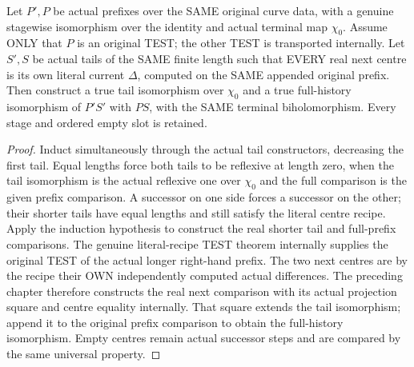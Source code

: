\begin{theorem}
\label{hir:sharp-original-curve-equal-length-difference-recipe-comparison}
\leanok
Let $P',P$ be actual prefixes over the SAME original curve data, with a
genuine stagewise isomorphism over the identity and actual terminal map
$\chi_0$. Assume ONLY that $P$ is an original TEST; the other TEST is
transported internally. Let $S',S$ be actual tails of the SAME finite
length such that EVERY real next centre is its own literal current
$\Delta$, computed on the SAME appended original prefix. Then construct
a true tail isomorphism over $\chi_0$ and a true full-history isomorphism
of $P'S'$ with $PS$, with the SAME terminal biholomorphism. Every stage
and ordered empty slot is retained.
\end{theorem}
\begin{proof}
Induct simultaneously through the actual tail constructors, decreasing
the first tail. Equal lengths force both tails to be reflexive at length
zero, when the tail isomorphism is the actual reflexive one over
$\chi_0$ and the full comparison is the given prefix comparison.
A successor on one side forces a successor on the other; their shorter
tails have equal lengths and still satisfy the literal centre recipe.
Apply the induction hypothesis to construct the real shorter tail and
full-prefix comparisons. The genuine literal-recipe TEST theorem
internally supplies the original TEST of the actual longer right-hand
prefix. The two next centres are by the recipe their OWN independently
computed actual differences. The preceding chapter therefore
constructs the real next comparison with its actual projection square
and centre equality internally. That square extends the tail
isomorphism; append it to the original prefix comparison to obtain the
full-history isomorphism. Empty centres remain actual successor steps
and are compared by the same universal property.
\end{proof}

